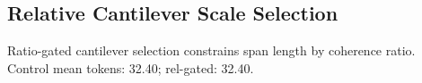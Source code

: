 \subsection{Relative Cantilever Scale Selection}
Ratio-gated cantilever selection constrains span length by coherence ratio.
Control mean tokens: 32.40; rel-gated: 32.40.
